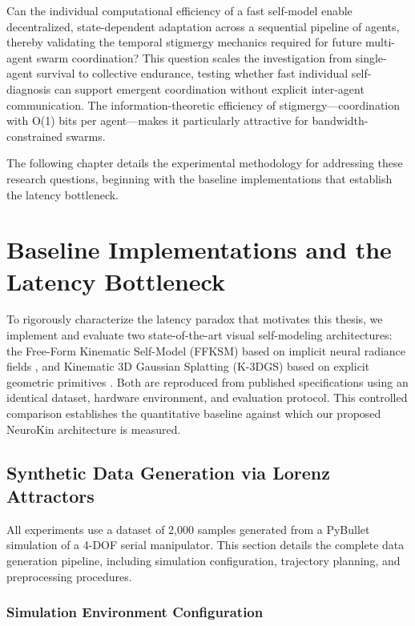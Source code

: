 \documentclass[12pt,a4paper,oneside]{report}
\begin{document}
Can the individual computational efficiency of a fast self-model enable decentralized, state-dependent adaptation across a sequential pipeline of agents, thereby validating the temporal stigmergy mechanics required for future multi-agent swarm coordination? This question scales the investigation from single-agent survival to collective endurance, testing whether fast individual self-diagnosis can support emergent coordination without explicit inter-agent communication. The information-theoretic efficiency of stigmergy---coordination with O(1) bits per agent---makes it particularly attractive for bandwidth-constrained swarms.

The following chapter details the experimental methodology for addressing these research questions, beginning with the baseline implementations that establish the latency bottleneck.
\clearpage

\chapter{Baseline Implementations and the Latency Bottleneck}
\label{chap:baseline_latency_bottleneck}

To rigorously characterize the latency paradox that motivates this thesis, we implement and evaluate two state-of-the-art visual self-modeling architectures: the Free-Form Kinematic Self-Model (FFKSM) based on implicit neural radiance fields \cite{hu2024teaching}, and Kinematic 3D Gaussian Splatting (K-3DGS) based on explicit geometric primitives \cite{hu2025learning}. Both are reproduced from published specifications using an identical dataset, hardware environment, and evaluation protocol. This controlled comparison establishes the quantitative baseline against which our proposed NeuroKin architecture is measured.

\section{Synthetic Data Generation via Lorenz Attractors}

All experiments use a dataset of 2,000 samples generated from a PyBullet simulation of a 4-DOF serial manipulator. This section details the complete data generation pipeline, including simulation configuration, trajectory planning, and preprocessing procedures.

\subsection{Simulation Environment Configuration}
\end{document}
